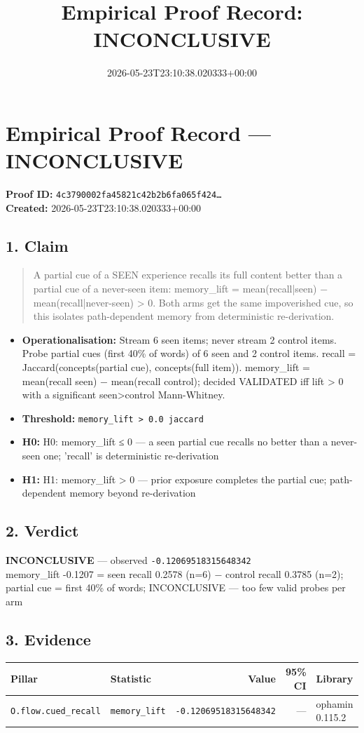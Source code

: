 \documentclass{article}
\title{Empirical Proof Record: INCONCLUSIVE}
\date{2026-05-23T23:10:38.020333+00:00}
\begin{document}
\maketitle
\section*{Empirical Proof Record --- \textcolor{inconclusive}{\textbf{INCONCLUSIVE}}}
\textbf{Proof ID:} \texttt{4c3790002fa45821c42b2b6fa065f424\dots}\\
\textbf{Created:} 2026-05-23T23:10:38.020333+00:00
\subsection*{1. Claim}
\begin{quote}A partial cue of a SEEN experience recalls its full content better than a partial cue of a never-seen item: memory\_lift = mean(recall|seen) − mean(recall|never-seen) > 0. Both arms get the same impoverished cue, so this isolates path-dependent memory from deterministic re-derivation.\end{quote}
\begin{itemize}
\item \textbf{Operationalisation:} Stream 6 seen items; never stream 2 control items. Probe partial cues (first 40\% of words) of 6 seen and 2 control items. recall = Jaccard(concepts(partial cue), concepts(full item)). memory\_lift = mean(recall seen) − mean(recall control); decided VALIDATED iff lift > 0 with a significant seen>control Mann-Whitney.
\item \textbf{Threshold:} \texttt{memory\_lift > 0.0 jaccard}
\item \textbf{H0:} H0: memory\_lift ≤ 0 — a seen partial cue recalls no better than a never-seen one; 'recall' is deterministic re-derivation
\item \textbf{H1:} H1: memory\_lift > 0 — prior exposure completes the partial cue; path-dependent memory beyond re-derivation
\end{itemize}
\subsection*{2. Verdict}
\textcolor{inconclusive}{\textbf{INCONCLUSIVE}} --- observed \texttt{-0.12069518315648342}\\
memory\_lift -0.1207 = seen recall 0.2578 (n=6) − control recall 0.3785 (n=2); partial cue = first 40\% of words; INCONCLUSIVE — too few valid probes per arm
\subsection*{3. Evidence}
\begin{tabular}{llrrl}\toprule
\textbf{Pillar} & \textbf{Statistic} & \textbf{Value} & \textbf{95\% CI} & \textbf{Library} \\\midrule
\texttt{O.flow.cued\_recall} & \texttt{memory\_lift} & \texttt{-0.12069518315648342} & --- & ophamin 0.115.2 \\
\bottomrule\end{tabular}
\end{document}
